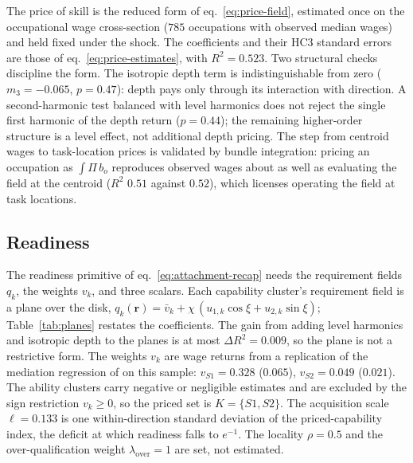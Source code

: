 \documentclass[12pt, a4paper]{article}
\newcommand{\rr}{\mathbf{r}}
\begin{document}
The price of skill is the reduced form of eq.~\eqref{eq:price-field},
estimated once on the occupational wage cross-section ($785$
occupations with observed median wages) and held fixed under the shock.
The coefficients and their HC3 standard errors are those of
eq.~\eqref{eq:price-estimates}, with $R^2 = 0.523$. Two structural
checks discipline the form. The isotropic depth term is
indistinguishable from zero ($m_3 = -0.065$, $p = 0.47$): depth pays
only through its interaction with direction. A second-harmonic test
balanced with level harmonics does not reject the single first harmonic
of the depth return ($p = 0.44$); the remaining higher-order structure
is a level effect, not additional depth pricing. The step from centroid
wages to task-location prices is validated by bundle integration:
pricing an occupation as $\int \Pi\, b_o$ reproduces observed wages
about as well as evaluating the field at the centroid ($R^2$ $0.51$
against $0.52$), which licenses operating the field at task locations.

\subsection*{Readiness}

The readiness primitive of eq.~\eqref{eq:attachment-recap} needs the
requirement fields $q_k$, the weights $v_k$, and three scalars. Each
capability cluster's requirement field is a plane over the disk,
$q_k(\rr) = \bar v_k + \chi\,(u_{1,k}\cos\xi + u_{2,k}\sin\xi)$;
Table~\ref{tab:planes} restates the coefficients. The gain from adding
level harmonics and isotropic depth to the planes is at most
$\Delta R^2 = 0.009$, so the plane is not a restrictive form. The
weights $v_k$ are wage returns from a replication of the mediation
regression of \textcite{storck2026geometry} on this sample:
$v_{S1} = 0.328$ ($0.065$), $v_{S2} = 0.049$ ($0.021$). The ability
clusters carry negative or negligible estimates and are excluded by the
sign restriction $v_k \geq 0$, so the priced set is $K = \{S1, S2\}$.
The acquisition scale $\ell = 0.133$ is one within-direction standard
deviation of the priced-capability index, the deficit at which
readiness falls to $e^{-1}$. The locality $\rho = 0.5$ and the
over-qualification weight $\lambda_{\mathrm{over}} = 1$ are set, not
estimated.
\end{document}
